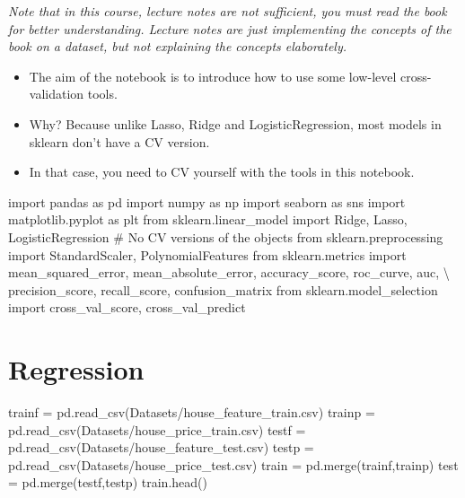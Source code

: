 \documentclass[
  letterpaper,
  DIV=11,
  numbers=noendperiod]{scrreprt}
\newenvironment{Shaded}{\begin{snugshade}}{\end{snugshade}}
\newcommand{\CommentTok}[1]{\textcolor[rgb]{0.37,0.37,0.37}{#1}}
\newcommand{\ImportTok}[1]{\textcolor[rgb]{0.00,0.46,0.62}{#1}}
\newcommand{\NormalTok}[1]{\textcolor[rgb]{0.00,0.23,0.31}{#1}}
\newcommand{\OperatorTok}[1]{\textcolor[rgb]{0.37,0.37,0.37}{#1}}
\newcommand{\StringTok}[1]{\textcolor[rgb]{0.13,0.47,0.30}{#1}}
\providecommand{\tightlist}{%
  \setlength{\itemsep}{0pt}\setlength{\parskip}{0pt}}\usepackage{longtable,booktabs,array}
\begin{document}
\emph{Note that in this course, lecture notes are not sufficient, you
must read the book for better understanding. Lecture notes are just
implementing the concepts of the book on a dataset, but not explaining
the concepts elaborately.}

\begin{itemize}
\tightlist
\item
  The aim of the notebook is to introduce how to use some low-level
  cross-validation tools.
\item
  Why? Because unlike Lasso, Ridge and LogisticRegression, most models
  in sklearn don't have a CV version.
\item
  In that case, you need to CV yourself with the tools in this notebook.
\end{itemize}

\begin{Shaded}
\begin{Highlighting}[]
\ImportTok{import}\NormalTok{ pandas }\ImportTok{as}\NormalTok{ pd}
\ImportTok{import}\NormalTok{ numpy }\ImportTok{as}\NormalTok{ np}
\ImportTok{import}\NormalTok{ seaborn }\ImportTok{as}\NormalTok{ sns}
\ImportTok{import}\NormalTok{ matplotlib.pyplot }\ImportTok{as}\NormalTok{ plt}
\ImportTok{from}\NormalTok{ sklearn.linear\_model }\ImportTok{import}\NormalTok{ Ridge, Lasso, LogisticRegression }\CommentTok{\# No CV versions of the objects}
\ImportTok{from}\NormalTok{ sklearn.preprocessing }\ImportTok{import}\NormalTok{ StandardScaler, PolynomialFeatures}
\ImportTok{from}\NormalTok{ sklearn.metrics }\ImportTok{import}\NormalTok{ mean\_squared\_error, mean\_absolute\_error, accuracy\_score, roc\_curve, auc, }\OperatorTok{\textbackslash{}}
\NormalTok{precision\_score, recall\_score, confusion\_matrix}
\ImportTok{from}\NormalTok{ sklearn.model\_selection }\ImportTok{import}\NormalTok{ cross\_val\_score, cross\_val\_predict}
\end{Highlighting}
\end{Shaded}

\section{Regression}\label{regression}

\begin{Shaded}
\begin{Highlighting}[]
\NormalTok{trainf }\OperatorTok{=}\NormalTok{ pd.read\_csv(}\StringTok{\textquotesingle{}Datasets/house\_feature\_train.csv\textquotesingle{}}\NormalTok{)}
\NormalTok{trainp }\OperatorTok{=}\NormalTok{ pd.read\_csv(}\StringTok{\textquotesingle{}Datasets/house\_price\_train.csv\textquotesingle{}}\NormalTok{)}
\NormalTok{testf }\OperatorTok{=}\NormalTok{ pd.read\_csv(}\StringTok{\textquotesingle{}Datasets/house\_feature\_test.csv\textquotesingle{}}\NormalTok{)}
\NormalTok{testp }\OperatorTok{=}\NormalTok{ pd.read\_csv(}\StringTok{\textquotesingle{}Datasets/house\_price\_test.csv\textquotesingle{}}\NormalTok{)}
\NormalTok{train }\OperatorTok{=}\NormalTok{ pd.merge(trainf,trainp)}
\NormalTok{test }\OperatorTok{=}\NormalTok{ pd.merge(testf,testp)}
\NormalTok{train.head()}
\end{Highlighting}
\end{Shaded}
\end{document}
